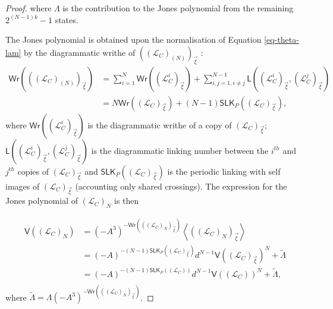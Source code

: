 \documentclass{article}
\begin{document}
\begin{proof}
\noindent where $\Lambda$ is the contribution to the Jones polynomial from the remaining $2^{(N-1)k}-1$ states.

The Jones polynomial is obtained upon the normalisation of Equation \ref{eq-theta-lam} by the diagrammatic writhe of $ {((\mathcal{L}_C)_{(N)})}_{\vec{\xi}}$ :
\begin{equation}
\begin{split}\displaystyle \mathsf{Wr}\left({((\mathcal{L}_C)_{(N)})}_{\vec{\xi}}\right) &= \sum_{i=1}^{N} \mathsf{Wr}\left((\mathcal{L}_C^i)_{\vec{\xi}}\right) + \sum_{i,j=1, i\neq j}^{N-1} \mathsf{L}\left((\mathcal{L}_C^i)_{\vec{\xi}},(\mathcal{L}_C^{j})_{\vec{\xi}}\right)\\&= N \mathsf{Wr}\left({(\mathcal{L}_C)}_{\vec{\xi}}\right) + (N-1) \mathsf{SLK}_P\left({(\mathcal{L}_C)}_{\vec{\xi}}\right),
\end{split}
\label{wrr1}
\end{equation}
where $\mathsf{Wr}\left({(\mathcal{L}_C^i)}_{\vec{\xi}}\right)$ is the diagrammatic writhe of a copy of ${(\mathcal{L}_C)}_{\vec{\xi}}$; $\mathsf{L}\left((\mathcal{L}_C^i)_{\vec{\xi}},(\mathcal{L}_C^{j})_{\vec{\xi}}\right)$ is the diagrammatic linking number between the $i^{th}$ and $j^{th}$ copies of ${(\mathcal{L}_C)}_{\vec{\xi}}$ and $\mathsf{SLK}_P\left({(\mathcal{L}_C)}_{\vec{\xi}}\right)$ is the periodic linking  with self images of ${(\mathcal{L}_C)}_{\vec{\xi}}$ (accounting only shared crossings). The expression for the Jones polynomial of $(\mathcal{L}_C)_{N}$ is then 

\begin{equation}
    \begin{split}\displaystyle
        \mathsf{V}\left((\mathcal{L}_C)_{N}\right) &= {(-A^3)}^{-\mathsf{Wr}\left({((\mathcal{L}_C)_{N})}_{\vec{\xi}}\right)} \left\langle {((\mathcal{L}_C)_{N})}_{\vec{\xi}} \right\rangle\\
         &=(-A)^{-(N-1)\mathsf{SLK}_P\left({(\mathcal{L}_C)}_{\vec{\xi}}\right)} d^{N-1} {\mathsf{V}\left({(\mathcal{L}_C)}_{\vec{\xi}}\right)}^N + \tilde{\Lambda}\\
        &=(-A)^{-(N-1)\mathsf{SLK}_P\left({(\mathcal{L}_C)}\right)} d^{N-1} {\mathsf{V}\left({(\mathcal{L}_C)}\right)}^N + \tilde{\Lambda},\\
    \end{split}
\end{equation}
where $\displaystyle \tilde{\Lambda} = \Lambda {(-A^3)}^{-\mathsf{Wr}\left({((\mathcal{L}_C)_{N})}_{\vec{\xi}}\right)}$. 
\end{proof}
\end{document}
